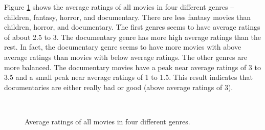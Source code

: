 Figure \ref{fig:average-3-genres} shows the average ratings of all movies in four different genres -- children, fantasy, horror, and documentary. There are less fantasy movies than children, horror, and documentary. The first genres seems to have average ratings of about 2.5 to 3. The documentary genre has more high average ratings than the rest. In fact, the documentary genre seems to have more movies with above average ratings than movies with below average ratings. The other genres are more balanced. The documentary movies have a peak near average ratings of 3 to 3.5 and a small peak near average ratings of 1 to 1.5. This result indicates that documentaries are either really bad or good (above average ratings of 3).


\begin{figure}[H]
	\centering
	\\
	\caption{Average ratings of all movies in four different genres.} \label{fig:average-3-genres}
\end{figure}
